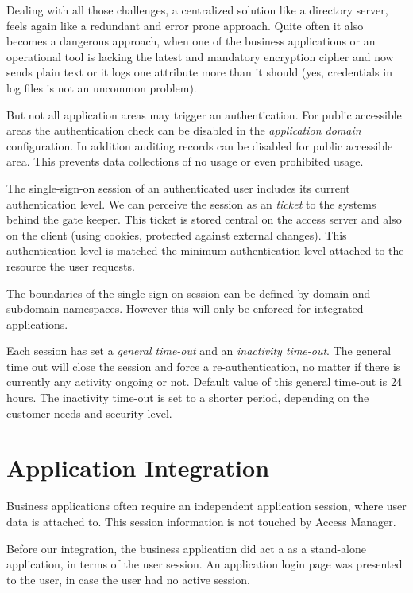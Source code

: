 Dealing with all those challenges, a centralized solution like a
directory server, feels again like a redundant and error prone approach.
Quite often it also becomes a dangerous approach, when one of the
business applications or an operational tool is lacking the latest and
mandatory encryption cipher and now sends plain text or it logs one
attribute more than it should (yes, credentials in log files is not an
uncommon problem).


But not all application areas may trigger an authentication.  For public
accessible areas the authentication check can be disabled in the
\emph{application domain} configuration. In addition auditing records
can be disabled for public accessible area.  This prevents data
collections of no usage or even prohibited usage.

The single-sign-on session of an authenticated user includes its current
authentication level.  We can perceive the session as an \emph{ticket}
to the systems behind the gate keeper.  This ticket is stored central on
the access server and also on the client (using cookies, protected
against external changes). This authentication level is matched the
minimum authentication level attached to the resource the user requests.

The boundaries of the single-sign-on session can be defined by domain
and subdomain namespaces. However this will only be enforced for
integrated applications.

Each session has set a \emph{general time-out} and an \emph{inactivity
time-out}. The general time out will close the session and force a
re-authentication, no matter if there is currently any activity ongoing
or not. Default value of this general time-out is 24 hours. The
inactivity time-out is set to a shorter period, depending on the
customer needs and security level.


\section{Application Integration}

Business applications often require an independent application session,
where user data is attached to. This session information is not touched
by Access Manager.

Before our integration, the business application did act a as a
stand-alone application, in terms of the user session. An application
login page was presented to the user, in case the user had no active
session.

